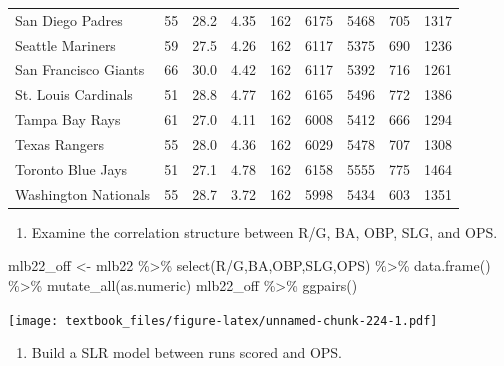\documentclass[
  11pt,
]{book}
\newenvironment{Shaded}{\begin{snugshade}}{\end{snugshade}}
\newcommand{\AttributeTok}[1]{\textcolor[rgb]{0.77,0.63,0.00}{#1}}
\newcommand{\FunctionTok}[1]{\textcolor[rgb]{0.00,0.00,0.00}{#1}}
\newcommand{\NormalTok}[1]{#1}
\newcommand{\OtherTok}[1]{\textcolor[rgb]{0.56,0.35,0.01}{#1}}
\newcommand{\SpecialCharTok}[1]{\textcolor[rgb]{0.00,0.00,0.00}{#1}}
\newcommand{\StringTok}[1]{\textcolor[rgb]{0.31,0.60,0.02}{#1}}
\providecommand{\tightlist}{%
  \setlength{\itemsep}{0pt}\setlength{\parskip}{0pt}}
\theoremstyle{definition}
\theoremstyle{definition}
\theoremstyle{definition}
\theoremstyle{definition}
\theoremstyle{remark}
\begin{document}
\begin{tabular}{lllllllll}
San Diego Padres & 55 & 28.2 & 4.35 & 162 & 6175 & 5468 & 705 & 1317\\
Seattle Mariners & 59 & 27.5 & 4.26 & 162 & 6117 & 5375 & 690 & 1236\\
San Francisco Giants & 66 & 30.0 & 4.42 & 162 & 6117 & 5392 & 716 & 1261\\
\addlinespace
St. Louis Cardinals & 51 & 28.8 & 4.77 & 162 & 6165 & 5496 & 772 & 1386\\
Tampa Bay Rays & 61 & 27.0 & 4.11 & 162 & 6008 & 5412 & 666 & 1294\\
Texas Rangers & 55 & 28.0 & 4.36 & 162 & 6029 & 5478 & 707 & 1308\\
Toronto Blue Jays & 51 & 27.1 & 4.78 & 162 & 6158 & 5555 & 775 & 1464\\
Washington Nationals & 55 & 28.7 & 3.72 & 162 & 5998 & 5434 & 603 & 1351\\
\bottomrule
\end{tabular}

\newpage

\begin{enumerate}
\def\labelenumi{(\alph{enumi})}
\setcounter{enumi}{1}
\tightlist
\item
  Examine the correlation structure between R/G, BA, OBP, SLG, and OPS.
\end{enumerate}

\begin{Shaded}
\begin{Highlighting}[]
\NormalTok{mlb22\_off }\OtherTok{\textless{}{-}}\NormalTok{ mlb22 }\SpecialCharTok{\%\textgreater{}\%} \FunctionTok{select}\NormalTok{(}\StringTok{\textasciigrave{}}\AttributeTok{R/G}\StringTok{\textasciigrave{}}\NormalTok{,BA,OBP,SLG,OPS) }\SpecialCharTok{\%\textgreater{}\%} \FunctionTok{data.frame}\NormalTok{() }\SpecialCharTok{\%\textgreater{}\%} \FunctionTok{mutate\_all}\NormalTok{(as.numeric)}
\NormalTok{mlb22\_off }\SpecialCharTok{\%\textgreater{}\%} \FunctionTok{ggpairs}\NormalTok{()}
\end{Highlighting}
\end{Shaded}

\texttt{[image: textbook\_files/figure-latex/unnamed-chunk-224-1.pdf]}

\newpage

\begin{enumerate}
\def\labelenumi{(\alph{enumi})}
\setcounter{enumi}{2}
\tightlist
\item
  Build a SLR model between runs scored and OPS.
\end{enumerate}
\end{document}
